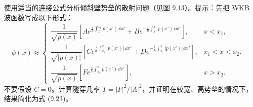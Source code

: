 \begin{question}
使用适当的连接公式分析倾斜壁势垒的散射问题（见图 9.13）。提示：先把 WKB 波函数写成以下形式：
\[
\psi(x)\approx
\begin{cases}
\dfrac{1}{\sqrt{p(x)}}\left[Ae^{\frac{i}{\hbar}\int_x^{x_1}p(x')\,\dd x'}+Be^{-\frac{i}{\hbar}\int_x^{x_1}p(x')\,\dd x'}\right], & x<x_1,\\[1.1em]
\dfrac{1}{\sqrt{|p(x)|}}\left[Ce^{\frac{1}{\hbar}\int_{x_1}^x|p(x')|\,\dd x'}+De^{-\frac{1}{\hbar}\int_{x_1}^x|p(x')|\,\dd x'}\right], & x_1<x<x_2,\\[1.1em]
\dfrac{1}{\sqrt{p(x)}}\left[Fe^{\frac{i}{\hbar}\int_{x_2}^x p(x')\,\dd x'}\right], & x>x_2.
\end{cases}
\]
不要假设 $C=0$。计算隧穿几率 $T=|F|^2/|A|^2$，并证明在较宽、高势垒的情况下，结果简化为式 (9.23)。

\par\smallskip
{}

\end{question}
